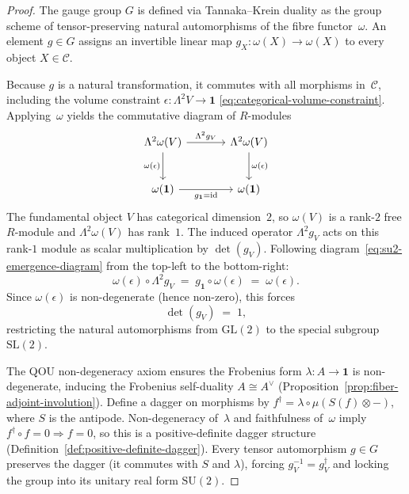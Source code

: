 \begin{proof}
The gauge group $G$ is defined via Tannaka--Krein duality as
the group scheme of tensor-preserving natural automorphisms of the fibre
functor~$\omega$.  An element $g \in G$ assigns an invertible linear map
$g_X \colon \omega(X) \to \omega(X)$ to every object $X \in \mathcal{C}$.

Because $g$ is a natural transformation, it commutes with all morphisms
in~$\mathcal{C}$, including the volume constraint
$\epsilon \colon \Lambda^2 V \to \mathbf{1}$
\eqref{eq:categorical-volume-constraint}.  Applying~$\omega$ yields the
commutative diagram of $R$-modules
\begin{equation}\label{eq:su2-emergence-diagram}
\begin{tikzcd}[row sep=2.5em, column sep=3.5em]
  \Lambda^2 \omega(V)
    \ar[r, "\Lambda^2 g_V"]
    \ar[d, "\omega(\epsilon)"']
  & \Lambda^2 \omega(V)
    \ar[d, "\omega(\epsilon)"]
  \\
  \omega(\mathbf{1})
    \ar[r, "g_{\mathbf{1}} = \mathrm{id}"']
  & \omega(\mathbf{1})
\end{tikzcd}
\end{equation}
The fundamental object $V$ has categorical dimension~$2$, so
$\omega(V)$ is a rank-$2$ free $R$-module and $\Lambda^2 \omega(V)$ has
rank~$1$.  The induced operator $\Lambda^2 g_V$ acts on this rank-$1$
module as scalar multiplication by $\det(g_V)$.  Following
diagram~\eqref{eq:su2-emergence-diagram} from the top-left to the
bottom-right:
\[
  \omega(\epsilon) \circ \Lambda^2 g_V
  \;=\;
  g_{\mathbf{1}} \circ \omega(\epsilon)
  \;=\;
  \omega(\epsilon).
\]
Since $\omega(\epsilon)$ is non-degenerate (hence non-zero), this forces
\begin{equation}\label{eq:det-one}
  \det(g_V) \;=\; 1,
\end{equation}
restricting the natural automorphisms from $\mathrm{GL}(2)$ to the
special subgroup $\mathrm{SL}(2)$.

The QOU non-degeneracy axiom ensures the Frobenius form
$\lambda \colon A \to \mathbf{1}$ is non-degenerate, inducing the
Frobenius self-duality $A \cong A^{\vee}$
(Proposition~\ref{prop:fiber-adjoint-involution}).  Define a dagger on
morphisms by $f^{\dagger} = \lambda \circ \mu(S(f) \otimes -)$, where
$S$ is the antipode.  Non-degeneracy of~$\lambda$ and faithfulness
of~$\omega$ imply $f^{\dagger} \circ f = 0 \Rightarrow f = 0$, so this
is a positive-definite dagger structure
(Definition~\ref{def:positive-definite-dagger}).  Every tensor
automorphism $g \in G$ preserves the dagger (it commutes with $S$ and
$\lambda$), forcing $g_V^{-1} = g_V^{\dagger}$ and locking the group
into its unitary real form $\mathrm{SU}(2)$.
\end{proof}

